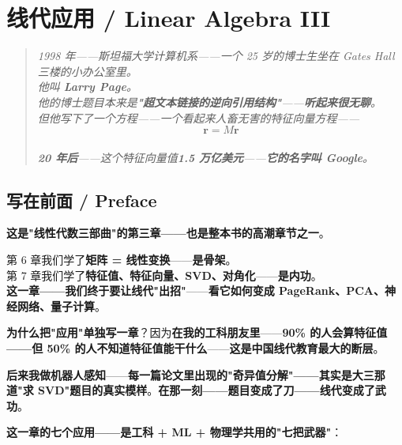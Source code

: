 
\chapter{线代应用 / Linear Algebra III}
\label{ch:linalg3}

\begin{quote}\itshape
1998 年——斯坦福大学计算机系——一个 25 岁的博士生坐在 Gates Hall 三楼的小办公室里。\\
他叫 \textbf{Larry Page}。\\
他的博士题目本来是\textbf{"超文本链接的逆向引用结构"}——\textbf{听起来很无聊}。\\
但他写下了一个方程——一个看起来人畜无害的特征向量方程——\\
\[
\bm{r} = M \bm{r}
\]
\\[6pt]
\textbf{20 年后}——这个特征向量值\textbf{1.5 万亿美元}——\textbf{它的名字叫 Google}。
\end{quote}

\section{写在前面 / Preface}

\textbf{这是"线性代数三部曲"的第三章——也是整本书的高潮章节之一}。

第 6 章我们学了\textbf{矩阵 = 线性变换}——\textbf{是骨架}。\\
第 7 章我们学了\textbf{特征值、特征向量、SVD、对角化}——\textbf{是内功}。\\
\textbf{这一章——我们终于要让线代"出招"}——\textbf{看它如何变成 PageRank、PCA、神经网络、量子计算}。

\textbf{为什么把"应用"单独写一章}？因为\textbf{在我的工科朋友里}——\textbf{90\% 的人会算特征值——但 50\% 的人不知道特征值能干什么}——\textbf{这是中国线代教育最大的断层}。

\textbf{后来我做机器人感知}——\textbf{每一篇论文里出现的"奇异值分解"——其实是大三那道"求 SVD"题目的真实模样}。\textbf{在那一刻——题目变成了刀——线代变成了武功}。

\textbf{这一章的七个应用——是工科 + ML + 物理学共用的"七把武器"}：

